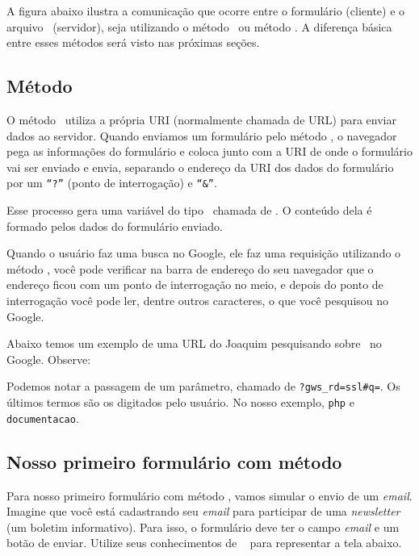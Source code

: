 A figura abaixo ilustra a comunicação que ocorre entre o formulário (cliente) e o arquivo 
\php~(servidor), seja utilizando o método \metodoGET~ou método \metodoPOST. A diferença básica 
entre esses métodos será visto nas próximas seções. 


\subsection{Método \metodoGET}
\label{metodo-get}

O método \metodoGET~utiliza a própria URI (normalmente chamada de URL) para enviar dados ao 
servidor. Quando enviamos um formulário pelo método \metodoGET, o navegador pega as informações 
do formulário e coloca junto com a URI de onde o formulário vai ser enviado e envia, 
separando o endereço da URI dos dados do formulário por um \texttt{``?''} (ponto de interrogação) 
e \texttt{``\&''}.

Esse processo gera uma variável do tipo \tipoarray~chamada de \variavelget. O conteúdo dela é
formado pelos dados do formulário enviado.

Quando o usuário faz uma busca no Google, ele faz uma requisição utilizando o método \metodoGET, 
você pode verificar na barra de endereço do seu navegador que o endereço ficou com um ponto de 
interrogação no meio, e depois do ponto de interrogação você pode ler, dentre outros caracteres, 
o que você pesquisou no Google.

Abaixo temos um exemplo de uma URL do Joaquim pesquisando sobre \php~no Google. Observe:


Podemos notar a passagem de um parâmetro, chamado de \texttt{?gws\_rd=ssl\#q=}. Os últimos termos
são os digitados pelo usuário. No nosso exemplo, \texttt{php} e \texttt{documentacao}.

\subsection{Nosso primeiro formulário com método \metodoGET}
\label{nosso-primeiro-formulario-com-metodo-get}

Para nosso primeiro formulário com método \metodoGET, vamos simular o envio de um 
\textit{email}. Imagine que você está cadastrando seu \textit{email} para participar 
de uma \textit{newsletter} (um boletim informativo). Para isso, o formulário deve 
ter o campo \textit{email} e um botão de enviar. Utilize seus conhecimentos de \html~
para representar a tela abaixo.

